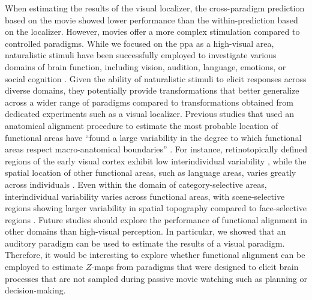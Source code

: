 
%
When estimating the results of the visual localizer, the cross-paradigm
prediction based on the movie showed lower performance than the
within-prediction based on the localizer.
%
However, movies offer a more complex stimulation compared to controlled
paradigms.
%
While we focused on the \ac{ppa} as a high-visual area, naturalistic stimuli
have been successfully employed to investigate various domains of brain
function, including vision, audition, language, emotions, or social cognition
\citep[s.][for a review]{jaaskelainen2021movies}.
%
Given the ability of naturalistic stimuli to elicit responses across diverse
domains, they potentially provide transformations that better generalize across
a wider range of paradigms compared to transformations obtained from dedicated
experiments such as a visual localizer.
%
Previous studies that used an anatomical alignment procedure to estimate the
most probable location of functional areas have ``found a large variability in
the degree to which functional areas respect macro-anatomical boundaries''
\citep[][p. 1369]{frost2012measuring}.
%
For instance, retinotopically defined regions of the early visual cortex exhibit
low interindividual variability \citep{rosenke2021probabilistic}, while the
spatial location of other functional areas, such as language areas, varies
greatly across individuals \citep{frost2012measuring}.
%
Even within the domain of category-selective areas, interindividual variability
varies across functional areas, with scene-selective regions showing larger
variability in spatial topography compared to face-selective regions
\citep{zhen2015quantifying, zhen2017quantifying, frost2012measuring}.
%
Future studies should explore the performance of functional alignment in other
domains than high-visual perception.
%
In particular, we showed that an auditory paradigm can be used to estimate the
results of a visual paradigm.
%
Therefore, it would be interesting to explore whether functional alignment can
be employed to estimate $Z$-maps from paradigms that were designed to elicit
brain processes that are not sampled during passive movie watching such as
planning or decision-making.

